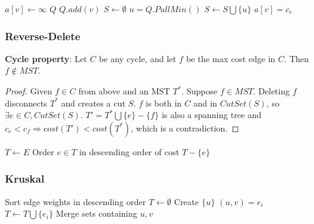 \begin{algorithm}[H]
\begin{algorithmic}[1]
 $a[v] \gets \infty$
\EndFor
\State $Q$
 $Q.add(v)$
\EndFor
\State $S \gets \emptyset$
\State $u = Q.PullMin()$
\State $S \gets S \bigcup \{u\}$
\State $a[v] = c_e$
\EndIf
\EndFor
\EndWhile
\EndProcedure
\end{algorithmic}
\end{algorithm}

\subsubsection*{Reverse-Delete}

\textbf{Cycle property}: Let $C$ be any cycle, and let $f$ be the max cost edge in $C$. 
Then $f \notin MST$. 

\begin{proof}[Proof]
Given $f \in C$ from above and an MST $T^*$. 
Suppose $f \in MST$.
Deleting $f$ disconnects $T^*$ and creates a cut $S$.
$f$ is both in $C$ and in $CutSet(S)$, so $\exists e \in C, CutSet(S)$. 
$T' = T^* \bigcup \{e\} - \{f\}$ is also a spanning tree and $c_e < c_f \Rightarrow cost(T') < cost(T^*)$, which is a contradiction.  	
\end{proof}

\begin{algorithm}[H]
\begin{algorithmic}[1]
\State $T \gets E$
\State Order $e \in T$ in descending order of cost
 $T - \{e\}$
\EndIf
\EndFor
\EndProcedure
\end{algorithmic}
\end{algorithm}

\subsubsection*{Kruskal}

\begin{algorithm}[H]
\begin{algorithmic}[1]
\State Sort edge weights in descending order
\State $T \gets \emptyset$
 Create $\{u\}$
\EndFor
{}
\State $(u,v) = e_i$
\State $T \gets T \bigcup \{e_i\}$
\State Merge sets containing $u,v$
\EndIf
\EndFor
\State {}
\EndProcedure
\end{algorithmic}
\end{algorithm}

